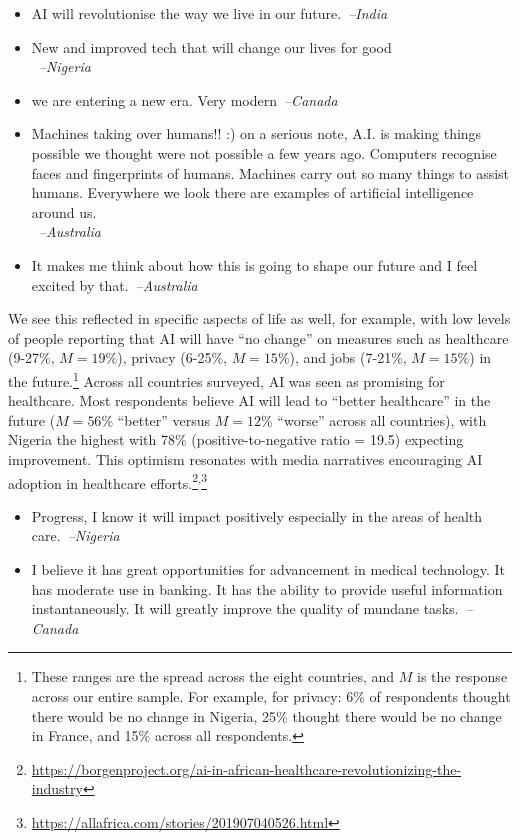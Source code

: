 \documentclass[sigconf]{acmart}
\newcommand\aff[1]{\textcolor{darkplum}{{\emph{--#1}}}}
\newcommand\q[1]{\textcolor{Mahogany}{\small{\textbf{}}}}
\newenvironment{lq2}
{ \begin{itemize}[leftmargin = 2.0em, rightmargin=1.0em, label={}]
    \fontsize{8.3pt}{8.9pt}\selectfont
\setlength{\itemsep}{3pt}
    \setlength{\parskip}{3pt}
    \setlength{\parsep}{3pt}     }
{ \end{itemize}                  }
\begin{document}
\begin{lq2}
\item AI will revolutionise the way we live in our future.~\aff{India}
\item New and improved tech that will change our lives for good\\~\aff{Nigeria}
\item we are entering a new era. Very modern~\aff{Canada}
\item Machines taking over humans!! :) on a serious note, A.I. is making things possible we thought were not possible a few years ago. Computers recognise faces and fingerprints of humans. Machines carry out so many things to assist humans. Everywhere we look there are examples of artificial intelligence around us.\\~\aff{Australia}
\item It makes me think about how this is going to shape our future and I feel excited by that.~\aff{Australia}
\end{lq2}

We see this reflected in specific aspects of life as well, for example, with low levels of people reporting that AI will have ``no change'' on 
measures such as healthcare (9-27\%, $M = 19\%$),\q{Q11} 
privacy (6-25\%, $M = 15\%$),\q{Q14}
and jobs (7-21\%, $M = 15\%$) in the future.\footnote{These ranges are the spread across the eight countries, and $M$ is the response across our entire sample. For example, for privacy: 6\% of respondents thought there would be no change in Nigeria, 25\% thought there would be no change in France, and 15\% across all respondents.}\q{Q8}
Across all countries surveyed, AI was seen as promising for healthcare.
Most respondents believe AI will lead to ``better healthcare'' in the future ($M = 56\%$ ``better'' versus $M = 12\%$ ``worse'' across all countries),\q{Q11} with Nigeria the highest with 78\% (positive-to-negative ratio = 19.5) expecting improvement.
This optimism resonates with media narratives encouraging AI adoption in healthcare efforts.\footnote{\url{https://borgenproject.org/ai-in-african-healthcare-revolutionizing-the-industry}}\textsuperscript{,}\footnote{\url{https://allafrica.com/stories/201907040526.html}}

\begin{lq2}
\item Progress, I know it will impact positively especially in the areas of health care.~\aff{Nigeria}
\item I believe it has great opportunities for advancement in medical technology. It has moderate use in banking. It has the ability to provide useful information instantaneously. It will greatly improve the quality of mundane tasks.~\aff{Canada}
\end{lq2}
\end{document}
